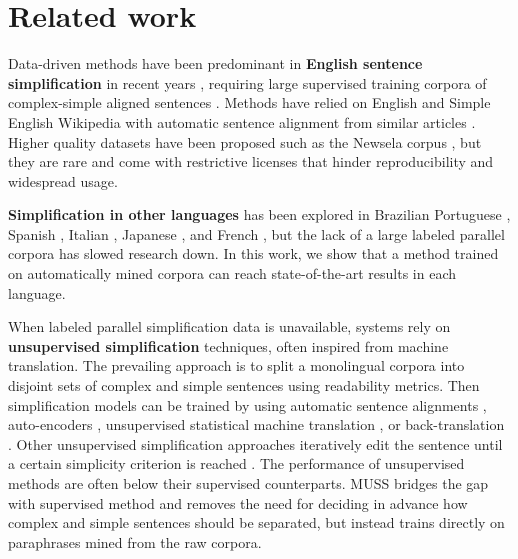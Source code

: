\documentclass[11pt]{article}
\newcommand{\newsela}{Newsela\xspace}
\newcommand{\muss}{\textsc{MUSS}\xspace}
\begin{document}
 \section{Related work}\label{sec:related_work}


Data-driven methods have been predominant in {\bf English sentence simplification} in  recent years \cite{alva2020data}, requiring large supervised training corpora of complex-simple aligned sentences \cite{wubben2012sentence,xu2016optimizing,zhang2017sentence,zhao2018integrating,martin2020controllable}.
Methods have relied on English and Simple English Wikipedia with automatic sentence alignment from similar articles \cite{zhu2010monolingual,coster2011learning,woodsend2011learning,kauchak2013improving,zhang2017sentence}. Higher quality datasets have been proposed such as the \newsela corpus \cite{xu2015problems}, but they are rare and come with restrictive licenses that hinder reproducibility and widespread usage.

{\bf Simplification in other languages} has been explored in Brazilian Portuguese \cite{aluisio2008towards}, Spanish \cite{saggion2015making,vstajner2015automatic}, Italian \cite{brunato2015design,tonelli2016simpitiki}, Japanese \cite{goto2015japanese,kajiwara2018text,katsuta2019improving}, and French \cite{gala2020alector}, but the lack of a large labeled parallel corpora has slowed research down.
In this work, we show that a method trained on automatically mined corpora can reach state-of-the-art results in each language.

When labeled parallel simplification data is unavailable, systems rely on {\bf unsupervised simplification} techniques, often inspired from machine translation.
The prevailing approach is to split a monolingual corpora into disjoint sets of complex and simple sentences using readability metrics. Then simplification models can be trained by using automatic sentence alignments \cite{kajiwara-komachi-2016-building,kajiwara2018text}, auto-encoders \cite{surya2018unsupervised,Zhao2020SemiSupervisedTS}, unsupervised statistical machine translation \cite{katsuta2019improving}, or back-translation \cite{aprosio2019neural}.
Other unsupervised simplification approaches iteratively edit the sentence until a certain simplicity criterion is reached \cite{kumar-etal-2020-iterative}.
The performance of unsupervised methods are often below their supervised counterparts.
\muss bridges the gap with supervised method and removes the need for deciding in advance how complex and simple sentences should be separated, but instead trains directly on paraphrases mined from the raw corpora.
\end{document}
